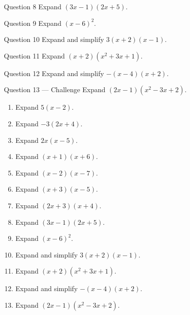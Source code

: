 \documentclass[11pt]{article}
\begin{document}
\begin{qbox}{Question 8}
Expand $(3x-1)(2x+5)$.\workspace{2.0cm}
\end{qbox}

\begin{qbox}{Question 9}
Expand $(x-6)^2$.\workspace{2.0cm}
\end{qbox}

\begin{qbox}{Question 10}
Expand and simplify $3(x+2)(x-1)$.\workspace{2.2cm}
\end{qbox}

\begin{qbox}{Question 11}
Expand $(x+2)(x^2+3x+1)$.\workspace{2.4cm}
\end{qbox}

\begin{qbox}{Question 12}
Expand and simplify $-(x-4)(x+2)$.\workspace{2.2cm}
\end{qbox}

\begin{qbox}{Question 13 --- Challenge}
Expand $(2x-1)(x^2-3x+2)$.\workspace{2.8cm}
\end{qbox}

\clearpage
{}

\begin{recapbox}
\begin{multicols}{2}
\small
\begin{enumerate}[leftmargin=*,itemsep=3pt]
  \item Expand $5(x-2)$.
  \item Expand $-3(2x+4)$.
  \item Expand $2x(x-5)$.
  \item Expand $(x+1)(x+6)$.
  \item Expand $(x-2)(x-7)$.
  \item Expand $(x+3)(x-5)$.
  \item Expand $(2x+3)(x+4)$.
  \item Expand $(3x-1)(2x+5)$.
  \item Expand $(x-6)^2$.
  \item Expand and simplify $3(x+2)(x-1)$.
  \item Expand $(x+2)(x^2+3x+1)$.
  \item Expand and simplify $-(x-4)(x+2)$.
  \item Expand $(2x-1)(x^2-3x+2)$.
\end{enumerate}
\end{multicols}
\end{recapbox}
\end{document}
